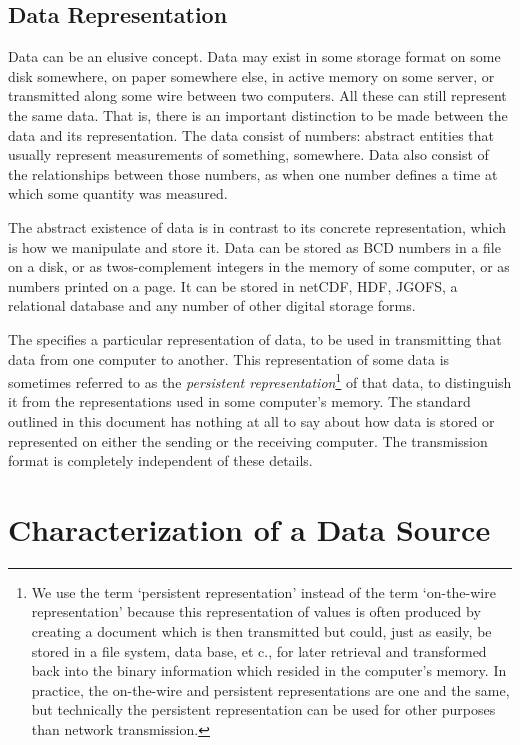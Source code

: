 \documentclass[justify]{nasa-ese}
\renewcommand{\new}[1]{\emph{#1}}
\begin{document}
\subsection{Data Representation}
\label{sec:data-representation}

Data can be an elusive concept.  Data may exist in some storage format
on some disk somewhere, on paper somewhere else, in active memory on
some server, or transmitted along some wire between two computers.
All these can still represent the same data.  That is, there is an
important distinction to be made between the data and its
representation.  The data consist of numbers: abstract entities that
usually represent measurements of something, somewhere.  Data also
consist of the relationships between those numbers, as when one number
defines a time at which some quantity was measured.  

The abstract existence of data is in contrast to its
concrete representation, which is how we manipulate and store it. Data
can be stored as BCD numbers in a file on a disk, or as
twos-complement integers in the memory of some computer, or as numbers
printed on a page. It can be stored in netCDF, HDF, JGOFS, a
relational database and any number of other digital storage forms.

The \DAP specifies a particular representation of data, to be used in
transmitting that data from one computer to another. This representation of
some data is sometimes referred to as the \new{persistent
representation}\footnote{We use the term `persistent representation' instead
of the term `on-the-wire representation' because this representation of values
is often produced by creating a document which is then transmitted but could,
just as easily, be stored in a file system, data base, et c., for later
retrieval and transformed back into the binary information which resided in
the computer's memory. In practice, the on-the-wire and persistent
representations are one and the same, but technically the persistent
representation can be used for other purposes than network transmission.} of
that data, to distinguish it from the representations used in some computer's
memory. The \DAP standard outlined in this document has nothing at all to say
about how data is stored or represented on either the sending or the
receiving computer. The \DAP transmission format is completely independent of
these details.


\section{Characterization of a Data Source}
\end{document}
